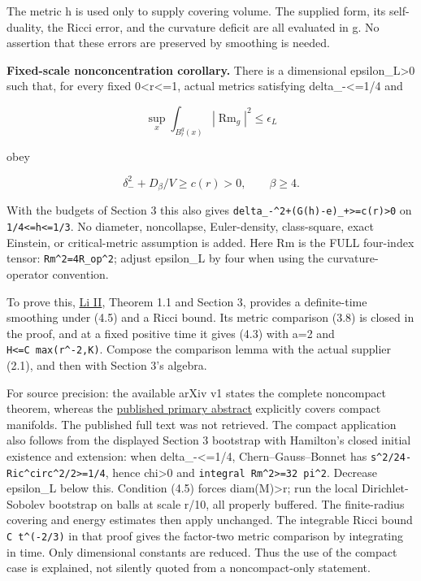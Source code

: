 \documentclass[
  10pt,
]{article}
\begin{document}
The metric h is used only to supply covering volume. The supplied form,
its self-duality, the Ricci error, and the curvature deficit are all
evaluated in g. No assertion that these errors are preserved by
smoothing is needed.

\textbf{Fixed-scale nonconcentration corollary.} There is a dimensional
epsilon\_L\textgreater0 such that, for every fixed
0\textless r\textless=1, actual metrics satisfying delta\_-\textless=1/4
and

\[
             \sup_x\int_{B_r^g(x)}|\operatorname{Rm}_g|^2
                              \le\epsilon_L          \tag{4.5}
\]

obey

\[
 \boxed{\delta_-^2+D_\beta/V\ge c(r)>0,
                              \qquad\beta\ge4.}      \tag{4.6}
\]

With the budgets of Section 3 this also gives
\texttt{delta\_-\^{}2+(G(h)-e)\_+\textgreater{}=c\textquotesingle{}(r)\textgreater{}0}
on \texttt{1/4\textless{}=h\textless{}=1/3}. No diameter, noncollapse,
Euler-density, class-square, exact Einstein, or critical-metric
assumption is added. Here Rm is the FULL four-index tensor:
\texttt{\textbar{}Rm\textbar{}\^{}2=4\textbar{}R\_op\textbar{}\^{}2};
adjust epsilon\_L by four when using the curvature-operator convention.

To prove this, \href{https://arxiv.org/pdf/0911.3104}{Li II}, Theorem
1.1 and Section 3, provides a definite-time smoothing under (4.5) and a
Ricci bound. Its metric comparison (3.8) is closed in the proof, and at
a fixed positive time it gives (4.3) with a=2 and
\texttt{H\textless{}=C\ max(r\^{}-2,K)}. Compose the comparison lemma
with the actual supplier (2.1), and then with Section 3's algebra.

For source precision: the available arXiv v1 states the complete
noncompact theorem, whereas the
\href{https://link.springer.com/article/10.1007/s10455-011-9290-0}{published
primary abstract} explicitly covers compact manifolds. The published
full text was not retrieved. The compact application also follows from
the displayed Section 3 bootstrap with Hamilton's closed initial
existence and extension: when delta\_-\textless=1/4,
Chern--Gauss--Bonnet has
\texttt{s\^{}2/24-\textbar{}Ric\^{}circ\textbar{}\^{}2/2\textgreater{}=1/4},
hence chi\textgreater0 and
\texttt{integral\ \textbar{}Rm\textbar{}\^{}2\textgreater{}=32\ pi\^{}2}.
Decrease epsilon\_L below this. Condition (4.5) forces
diam(M)\textgreater r; run the local Dirichlet-Sobolev bootstrap on
balls at scale r/10, all properly buffered. The finite-radius covering
and energy estimates then apply unchanged. The integrable Ricci bound
\texttt{C\ t\^{}(-2/3)} in that proof gives the factor-two metric
comparison by integrating in time. Only dimensional constants are
reduced. Thus the use of the compact case is explained, not silently
quoted from a noncompact-only statement.
\end{document}
